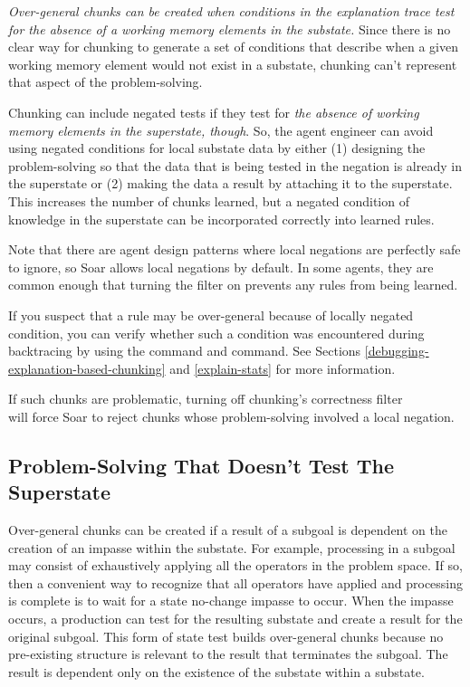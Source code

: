 \emph{Over-general chunks can be created when conditions in the explanation trace test for the absence of a working memory elements in the substate.} Since there is no clear way for chunking to generate a set of conditions that describe when a given working memory element would not exist in a substate, chunking can't represent that aspect of the problem-solving.

Chunking can include negated tests if they test for \textit{the absence of working memory elements in the superstate, though}.  So, the agent engineer can avoid using negated conditions for local substate data by either (1) designing the problem-solving so that the data that is being tested in the negation is already in the superstate or (2) making the data a result by attaching it to the superstate. This increases the number of chunks learned, but a negated condition of knowledge in the superstate can be incorporated correctly into learned rules.

Note that there are agent design patterns where local negations are perfectly safe to ignore, so Soar allows local negations by default.  In some agents, they are common enough that turning the filter on prevents any rules from being learned.

If you suspect that a rule may be over-general because of locally negated condition, you can verify whether such a condition was encountered during backtracing by using the  command and  command.  See Sections \ref{debugging-explanation-based-chunking} and \ref{explain-stats} for more information.

If such chunks are problematic, turning off chunking's correctness filter \\
 will force Soar to reject chunks whose problem-solving involved a local negation.

\subsection{Problem-Solving That Doesn't Test The Superstate}
\label{CHUNKING-subtleties-exhaustion}

Over-general chunks can be created if a result of a subgoal is dependent on the creation of an impasse within the substate. For example, processing in a subgoal may consist of exhaustively applying all the operators in the problem space. If so, then a convenient way to recognize that all operators have applied and processing is complete is to wait for a state no-change impasse to occur. When the impasse occurs, a production can test for the resulting substate and create a result for the original subgoal. This form of state test builds over-general chunks because no pre-existing structure is relevant to the result that terminates the subgoal. The result is dependent only on the existence of the substate within a substate.

